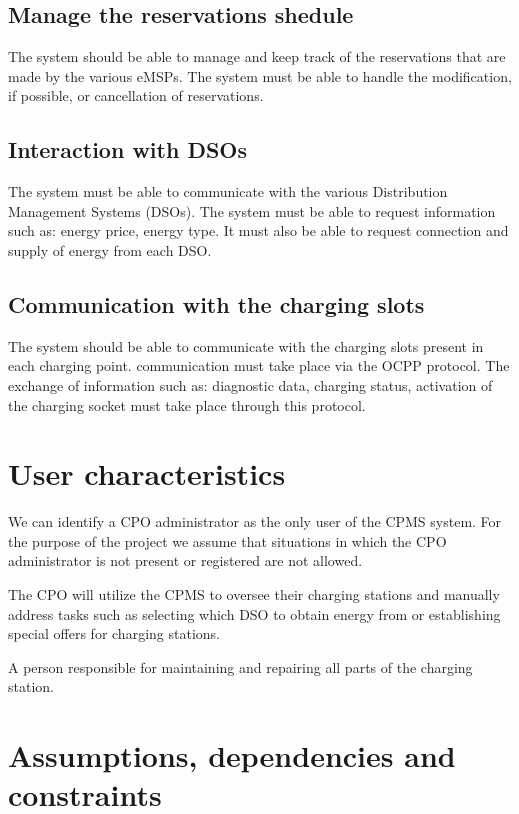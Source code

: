 \subsection{Manage the reservations shedule}
The system should be able to manage and keep track of the reservations that are made by the various eMSPs. The system must be able to handle the modification, if possible, or cancellation of reservations.

\subsection{Interaction with DSOs}
The system must be able to communicate with the various Distribution Management Systems (DSOs). The system must be able to request information such as: energy price, energy type. It must also be able to request connection and supply of energy from each DSO.

\subsection{Communication with the charging slots}
The system should be able to communicate with the charging slots present in each charging point. communication must take place via the OCPP protocol. The exchange of information such as: diagnostic data, charging status, activation of the charging socket must take place through this protocol.

\section{User characteristics}
We can identify a CPO administrator as the only user of the CPMS system. For the purpose of the project we assume that situations in which the CPO administrator is not present or registered are not allowed.

\begin{enumerate}
	The CPO will utilize the CPMS to oversee their charging stations and manually address tasks such as selecting which DSO to obtain energy from or establishing special offers for charging stations. 
	
	A person responsible for maintaining and repairing all parts of the charging station.
	
\end{enumerate}

\section{Assumptions, dependencies and constraints}

